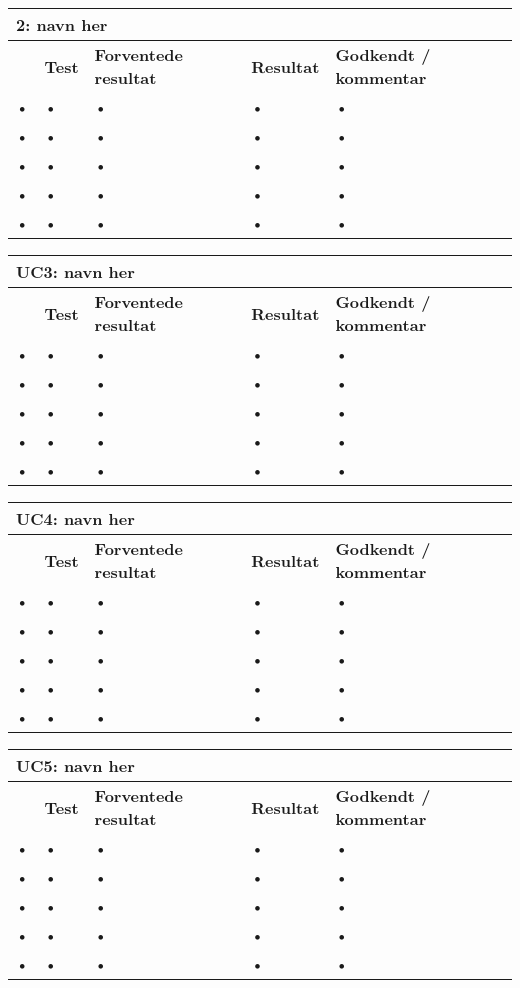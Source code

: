 \begin{longtable}{|p{5mm}|p{40mm}|p{40mm}|p{20mm}|p{25mm}|}
\hline 
\multicolumn{5}{|l|}{\textbf{2: navn her}} \\ 
\hline 
& \textbf{Test} & \textbf{Forventede resultat} & \textbf{Resultat} & \textbf{Godkendt / kommentar} \\ 
\hline 
• & • & • & • & • \\ 
\hline 
• & • & • & • & • \\ 
\hline 
• & • & • & • & • \\ 
\hline 
• & • & • & • & • \\ 
\hline 
• & • & • & • & • \\ 
\hline 
\end{longtable} 

\begin{longtable}{|p{5mm}|p{40mm}|p{40mm}|p{20mm}|p{25mm}|}
\hline 
\multicolumn{5}{|l|}{\textbf{UC3: navn her}} \\ 
\hline 
& \textbf{Test} & \textbf{Forventede resultat} & \textbf{Resultat} & \textbf{Godkendt / kommentar} \\ 
\hline 
• & • & • & • & • \\ 
\hline 
• & • & • & • & • \\ 
\hline 
• & • & • & • & • \\ 
\hline 
• & • & • & • & • \\ 
\hline 
• & • & • & • & • \\ 
\hline 
\end{longtable} 

\begin{longtable}{|p{5mm}|p{40mm}|p{40mm}|p{20mm}|p{25mm}|}
\hline 
\multicolumn{5}{|l|}{\textbf{UC4: navn her}} \\ 
\hline 
& \textbf{Test} & \textbf{Forventede resultat} & \textbf{Resultat} & \textbf{Godkendt / kommentar} \\ 
\hline 
• & • & • & • & • \\ 
\hline 
• & • & • & • & • \\ 
\hline 
• & • & • & • & • \\ 
\hline 
• & • & • & • & • \\ 
\hline 
• & • & • & • & • \\ 
\hline 
\end{longtable} 

\begin{longtable}{|p{5mm}|p{40mm}|p{40mm}|p{20mm}|p{25mm}|}
\hline 
\multicolumn{5}{|l|}{\textbf{UC5: navn her}} \\ 
\hline 
& \textbf{Test} & \textbf{Forventede resultat} & \textbf{Resultat} & \textbf{Godkendt / kommentar} \\ 
\hline 
• & • & • & • & • \\ 
\hline 
• & • & • & • & • \\ 
\hline 
• & • & • & • & • \\ 
\hline 
• & • & • & • & • \\ 
\hline 
• & • & • & • & • \\ 
\hline 
\end{longtable} 

